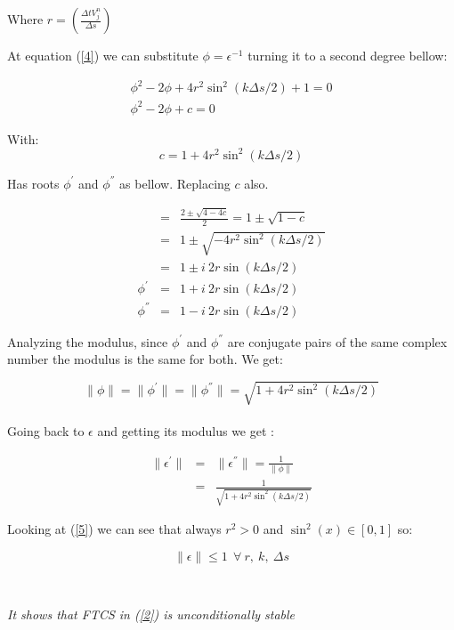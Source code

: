 \documentclass[legalpaper, 12pt]{book}
\begin{document}
Where $ r = \left( \frac{\Delta t  V_j^n}{\Delta s} \right) $

At equation (\ref{4}) we can substitute $ \phi = \epsilon^{-1} $ turning it to a second degree bellow:

\begin{eqnarray}
\phi^2 - 2 \phi +4 r^2 \sin^2 \left(k\Delta s/2 \right) +1 = 0  \nonumber \\
\phi^2 - 2 \phi + c = 0  \nonumber
\end{eqnarray}

With:
	$$ c = 1 +4 r^2 \sin^2 \left(k\Delta s/2 \right) $$

\newpage

Has roots $ \phi^{'} $ and $ \phi^{''} $ as bellow. Replacing $c$ also.

\begin{eqnarray}
 &=& \frac{2 \pm \sqrt{4 - 4c}}{2} = 1 \pm \sqrt{1-c} \nonumber \\
 &=& 1 \pm \sqrt{-4 r^2 \sin^2 \left(k\Delta s/2 \right) } \nonumber \\
 &=& 1 \pm i \ 2 r \sin \left(k\Delta s/2 \right)  \nonumber \\
 \phi^{'} &=& 1 + i \ 2 r \sin \left(k\Delta s/2 \right)   \nonumber \\
 \phi^{''} &=& 1 - i \ 2 r \sin \left(k\Delta s/2 \right)   \nonumber
\end{eqnarray}

Analyzing the modulus, since $  \phi^{'} $ and $  \phi^{''} $ are conjugate pairs of the same complex number the modulus is the same for both.
We get:

$$ \| \phi \| = \| \phi^{'} \| = \| \phi^{''} \| = \sqrt{1+ 4 r^2 \sin ^2 \left(k\Delta s/2 \right)}$$
\\
Going back to $\epsilon$ and getting its modulus we get :

\begin{eqnarray}
 \| \epsilon^{'} \| &=& \| \epsilon^{''} \| = \frac{1}{\| \phi  \|} \nonumber \\
 &=& \frac{1}{\sqrt{1+ 4 r^2 \sin ^2 \left(k\Delta s/2 \right)}} 
 \label{5}
\end{eqnarray}


Looking at (\ref{5}) we can see that always $ r^2 > 0 $ and $ \sin^2(x) \in [0, 1]  $ so:

$$ \| \epsilon \| \leq 1 \ \ \forall \ r, \ k,\ \Delta s$$

\

\textit{It shows that FTCS in (\ref{2}) is unconditionally stable}
\end{document}
